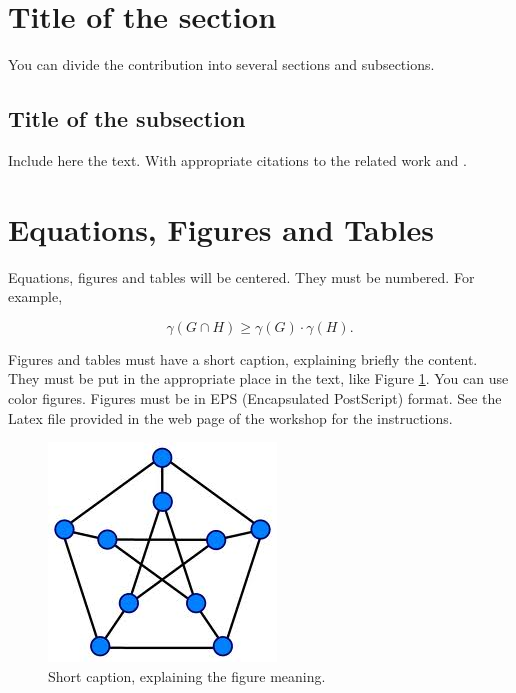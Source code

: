 \documentclass{dcsm}
\begin{document}
\section{Title of the section}
\label{sec_title}


You can divide the contribution into several sections and subsections.

\subsection{Title of the subsection}
\label{subs_title} Include here the text. With appropriate citations \cite{Kulick} to the related work \cite{Zhou} and \cite{BLMY}.

\section{Equations, Figures and Tables}

Equations, figures and tables will be centered. They must be numbered.
For example,

\begin{equation}
  \gamma(G \cap H)\ge \gamma(G) \cdot \gamma(H).
\end{equation}

Figures and tables must have a short caption, explaining briefly the content.
They must be put in the appropriate place in the text, like Figure \ref{fig_example}.
You can use color figures. Figures must be in EPS (Encapsulated PostScript) format.
See the Latex file provided in the web page of the workshop for the instructions.


\begin{figure}[ht]
  \centering
 \begin{center}
   \includegraphics[width=.4\textwidth]{images}
 \end{center}
 \caption{Short caption, explaining the figure meaning.}
 \label{fig_example}
\end{figure}
\end{document}
